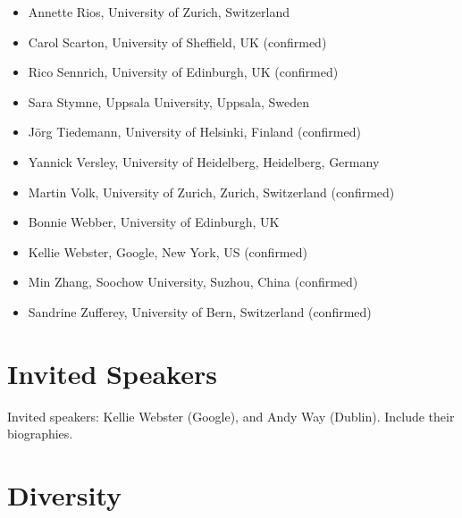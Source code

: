\documentclass[11pt]{article}
\begin{document}
\begin{itemize}
\item Annette Rios, University of Zurich, Switzerland
\item Carol Scarton, University of Sheffield, UK (confirmed)
\item Rico Sennrich, University of Edinburgh, UK (confirmed)
\item Sara Stymne, Uppsala University, Uppsala, Sweden %
\item Jörg Tiedemann, University of Helsinki, Finland (confirmed)
\item Yannick Versley, University of Heidelberg, Heidelberg, Germany %
\item Martin Volk, University of Zurich, Zurich, Switzerland (confirmed)
\item Bonnie Webber, University of Edinburgh, UK
\item Kellie Webster, Google, New York, US (confirmed)
\item Min Zhang, Soochow University, Suzhou, China (confirmed)
\item Sandrine Zufferey, University of Bern, Switzerland (confirmed)
\end{itemize}


\section{Invited Speakers} %

Invited speakers: Kellie Webster (Google), and Andy Way (Dublin).  Include their biographies. %


\section{Diversity}

\end{document}
